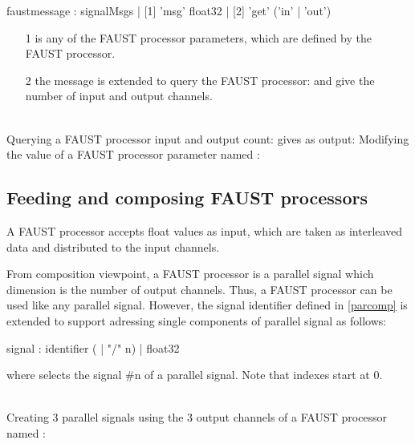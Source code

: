 \documentclass[a4paper,twoside]{report}
\newcommand{\subsublevel}[1]	{\subsection{#1}}
\newcommand{\sampleindent}	{ \hspace{0.5cm} }
\begin{document}

\begin{rail}
faustmessage : signalMsgs
			 | [1] 'msg' float32
			 | [2] 'get' ('in' | 'out')
\end{rail}

\begin{itemize}
\item [1]  is any of the FAUST processor parameters, which are defined by the FAUST processor.
\item [2] the  message is extended to query the FAUST processor:  and  give the number of input and output channels.
\end{itemize}

\example \\
Querying a FAUST processor input and output count:
\sampleindent gives as output:
Modifying the value of a FAUST processor parameter named :

\subsublevel{Feeding and composing FAUST processors}
\label{composefaust}

A FAUST processor accepts float values as input, which are taken as interleaved data and distributed to the input channels.

From composition viewpoint, a FAUST processor is a parallel signal which dimension is the number of output channels. 
Thus, a FAUST processor can be used like any parallel signal. However, the signal identifier defined in \ref{parcomp} is extended to support adressing single components of parallel signal as follows:
\begin{rail}
signal :  
		  identifier ( | "/" n)
		| float32
\end{rail}
where  selects the signal \#n of a parallel signal. Note that indexes start at 0.

\example \\
Creating 3 parallel signals using the 3 output channels of a FAUST processor named :
\end{document}
